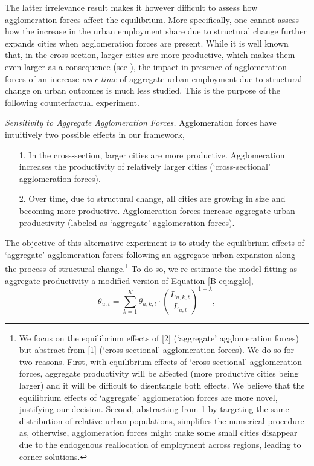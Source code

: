 \documentclass[11pt]{report}
\begin{document}
The latter irrelevance result makes it however difficult to assess how agglomeration forces affect the equilibrium. More specifically, one cannot assess how the increase in the urban employment share due to structural change further expands cities when agglomeration forces are present. While it is well known that, in the cross-section, larger cities are more productive, which makes them even larger as a consequence (see \cite{combesetal2010}), the impact in presence of agglomeration forces of an increase \emph{over time} of aggregate urban employment due to structural change on urban outcomes is much less studied. This is the purpose of the following counterfactual experiment.

\emph{Sensitivity to Aggregate Agglomeration Forces.} Agglomeration forces have intuitively two possible effects in our framework,
\begin{itemize}
\item[1.] In the cross-section, larger cities are more productive. Agglomeration increases the productivity of relatively larger cities (`cross-sectional' agglomeration forces).
\item[2.] Over time, due to structural change, all cities are growing in size and becoming more productive. Agglomeration forces increase aggregate urban productivity (labeled as `aggregate' agglomeration forces).
\end{itemize}
The objective of this alternative experiment is to study the equilibrium effects of `aggregate' agglomeration forces following an aggregate urban expansion along the process of structural change.\footnote{We focus on the equilibrium effects of [2] (`aggregate' agglomeration forces) but abstract from [1] (`cross sectional' agglomeration forces). We do so for two reasons. First, with equilibrium effects of `cross sectional' agglomeration forces, aggregate productivity will be affected (more productive cities being larger) and it will be difficult to disentangle both effects. We believe that the equilibrium effects of `aggregate' agglomeration forces are more novel, justifying our decision. Second, abstracting from 1 by targeting the same distribution of relative urban populations, simplifies the numerical procedure as, otherwise, agglomeration forces might make some small cities disappear due to the endogenous reallocation of employment across regions, leading to corner solutions.} To do so, we re-estimate the model fitting as aggregate productivity a modified version of Equation \eqref{B-eq:agglo},
\begin{equation}
\theta_{u,t}=\sum_{k=1}^{K}\theta_{u,k,t} \cdot \left( \frac{L_{u,k,t}}{L_{u,t}}\right)^{1+\lambda}, \label{B-eq:agglo2}
\end{equation}
\end{document}
